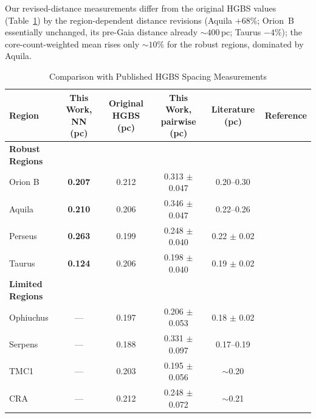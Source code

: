 \documentclass[usenatbib,twoside,twocolumn]{mnras}
\begin{document}
Our revised-distance measurements differ from the original HGBS values (Table~\ref{tab:literature}) by the region-dependent distance revisions (Aquila $+68\%$; Orion~B essentially unchanged, its pre-Gaia distance already $\sim400$\,pc; Taurus $-4\%$); the core-count-weighted mean rises only $\sim10\%$ for the robust regions, dominated by Aquila.

\begin{table}
\caption{Comparison with Published HGBS Spacing Measurements}
\label{tab:literature}
\begin{tabular}{lccccc}
\toprule
Region & This Work, NN (pc) & Original HGBS (pc) & This Work, pairwise (pc) & Literature (pc) & Reference \\
\midrule
\textbf{Robust Regions} &  &  &  &  &  \\
Orion B & \textbf{0.207} & 0.212 & 0.313 $\pm$ 0.047 & 0.20--0.30 & \citet{Konyves2020} \\
Aquila  & \textbf{0.210} & 0.206 & 0.346 $\pm$ 0.047 & 0.22--0.26 & \citet{Konyves2015} \\
Perseus & \textbf{0.263} & 0.199 & 0.248 $\pm$ 0.040 & 0.22 $\pm$ 0.02 & \citet{Pezzuto2021} \\
Taurus  & \textbf{0.124} & 0.206 & 0.198 $\pm$ 0.040 & 0.19 $\pm$ 0.02 & \citet{Hacar2013} \\
\midrule
\textbf{Limited Regions} &  &  &  &  &  \\
Ophiuchus & --- & 0.197 & 0.206 $\pm$ 0.053 & 0.18 $\pm$ 0.02 & \citet{Konyves2020} \\
Serpens  & --- & 0.188 & 0.331 $\pm$ 0.097 & 0.17--0.19 & \citet{Konyves2020} \\
TMC1     & --- & 0.203 & 0.195 $\pm$ 0.056 & $\sim$0.20 & \citet{Hacar2013} \\
CRA      & --- & 0.212 & 0.248 $\pm$ 0.072 & $\sim$0.21 & \citet{Konyves2020} \\
\bottomrule
\end{tabular}


\end{table}
\end{document}
